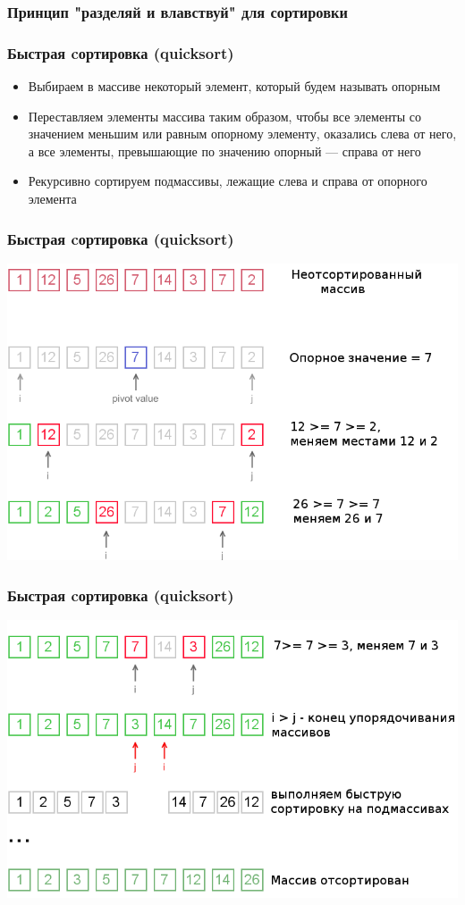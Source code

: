 \documentclass[14pt,pdf,hyperref={unicode}]{beamer}
\begin{document}
\begin{frame}[fragile]
\frametitle{Принцип "разделяй и влавствуй" для сортировки} 
\frametitle{Быстрая cортировка (quicksort)} 
\begin{itemize}
\item Выбираем в массиве некоторый элемент, который будем называть опорным \\
\item Переставляем элементы массива таким образом, чтобы все элементы со значением меньшим или равным опорному элементу, оказались слева от него, а все элементы, превышающие по значению опорный — справа от него \\
\item Рекурсивно сортируем подмассивы, лежащие слева и справа от опорного элемента\\
\end{itemize}
\end{frame}

\begin{frame}[fragile]
\frametitle{Быстрая cортировка (quicksort)} 
\begin{center}
\includegraphics[width=0.9\linewidth]{images/qs1.png}
\end{center}
\end{frame}

\begin{frame}[fragile]
\frametitle{Быстрая cортировка (quicksort)} 
\begin{center}
\includegraphics[width=0.9\linewidth]{images/qs2.png}
\end{center}
\end{frame}
\end{document}
